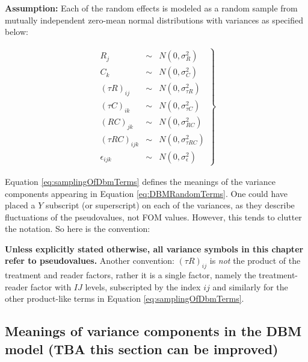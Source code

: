 \documentclass[
]{book}
\begin{document}
\textbf{Assumption:} Each of the random effects is modeled as a random sample from mutually independent zero-mean normal distributions with variances as specified below:

\begin{align}
\left.\begin{array}{rll}
{R_j}&\sim& N\left ( 0,\sigma_{R}^{2} \right ) \\[0.5em]
{C_k}&\sim& N\left ( 0,\sigma_{C}^{2} \right ) \\[0.5em]
{(\tau R)_{ij}}&\sim& N\left ( 0,\sigma_{\tau R}^{2} \right ) \\[0.5em]
{(\tau C)_{ik}}&\sim& N\left ( 0,\sigma_{\tau C}^{2} \right ) \\[0.5em]
{(RC)_{jk}}&\sim& N\left ( 0,\sigma_{RC}^{2} \right ) \\[0.5em]
{(\tau RC)_{ijk}}&\sim& N\left ( 0,\sigma_{\tau RC}^{2} \right ) \\[0.5em]
\epsilon_{ijk} &\sim& N\left ( 0,\sigma_{\epsilon}^{2} \right )
\end{array}\right\}
\label{eq:samplingOfDbmTerms}
\end{align}

Equation \eqref{eq:samplingOfDbmTerms} defines the meanings of the variance components appearing in Equation \eqref{eq:DBMRandomTerms}. One could have placed a \(Y\) subscript (or superscript) on each of the variances, as they describe fluctuations of the pseudovalues, not FOM values. However, this tends to clutter the notation. So here is the convention:

\textbf{Unless explicitly stated otherwise, all variance symbols in this chapter refer to pseudovalues. }
Another convention: \((\tau R)_{ij}\) is \emph{not} the product of the treatment and reader factors, rather it is a single factor, namely the treatment-reader factor with \(IJ\) levels, subscripted by the index \(ij\) and similarly for the other product-like terms in Equation \eqref{eq:samplingOfDbmTerms}.

\hypertarget{meanings-of-variance-components-in-the-dbm-model-tba-this-section-can-be-improved}{%
\subsection{\texorpdfstring{Meanings of variance components in the DBM model (\textbf{TBA this section can be improved})}{Meanings of variance components in the DBM model (TBA this section can be improved)}}\label{meanings-of-variance-components-in-the-dbm-model-tba-this-section-can-be-improved}}
\end{document}
